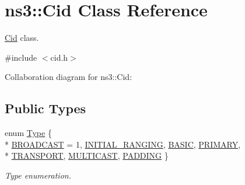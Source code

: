\hypertarget{classns3_1_1Cid}{}\section{ns3\+:\+:Cid Class Reference}
\label{classns3_1_1Cid}


\hyperlink{classns3_1_1Cid}{Cid} class.  




{\ttfamily \#include $<$cid.\+h$>$}



Collaboration diagram for ns3\+:\+:Cid\+:
\subsection*{Public Types}
\begin{DoxyCompactItemize}
\item 
enum \hyperlink{classns3_1_1Cid_a10b8f92080ca5790e65a0bfa2f557e0a}{Type} \{ \\*
\hyperlink{classns3_1_1Cid_a10b8f92080ca5790e65a0bfa2f557e0aa1ced0953e087f23571111ae36699415a}{B\+R\+O\+A\+D\+C\+A\+ST} = 1, 
\hyperlink{classns3_1_1Cid_a10b8f92080ca5790e65a0bfa2f557e0aac5353b87e0d0f5ce62535441b7554436}{I\+N\+I\+T\+I\+A\+L\+\_\+\+R\+A\+N\+G\+I\+NG}, 
\hyperlink{classns3_1_1Cid_a10b8f92080ca5790e65a0bfa2f557e0aa68b82b5b38abe3f2b40e5e3d950ac746}{B\+A\+S\+IC}, 
\hyperlink{classns3_1_1Cid_a10b8f92080ca5790e65a0bfa2f557e0aa0ffb28b79686aa37c614c868e330418b}{P\+R\+I\+M\+A\+RY}, 
\\*
\hyperlink{classns3_1_1Cid_a10b8f92080ca5790e65a0bfa2f557e0aa46fbed56841c3bf471aa84de022edf87}{T\+R\+A\+N\+S\+P\+O\+RT}, 
\hyperlink{classns3_1_1Cid_a10b8f92080ca5790e65a0bfa2f557e0aa4d3bf31623ed09b9755d86bdfa345a4a}{M\+U\+L\+T\+I\+C\+A\+ST}, 
\hyperlink{classns3_1_1Cid_a10b8f92080ca5790e65a0bfa2f557e0aaba9176e59d85e674eb4035dd134211c5}{P\+A\+D\+D\+I\+NG}
 \}\begin{DoxyCompactList}\small\item\em Type enumeration. \end{DoxyCompactList}
\end{DoxyCompactItemize}

